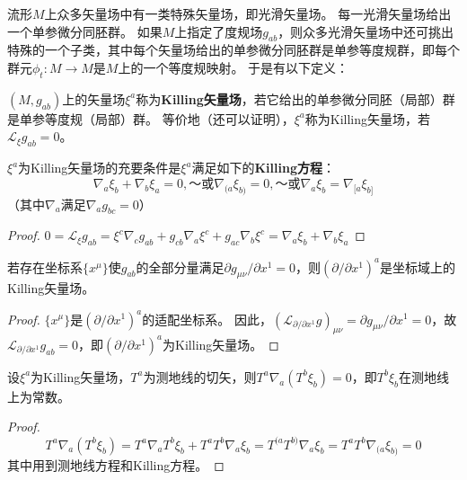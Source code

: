 流形$M$上众多矢量场中有一类特殊矢量场，即光滑矢量场。
每一光滑矢量场给出一个单参微分同胚群。
如果$M$上指定了度规场$g_{ab}$，则众多光滑矢量场中还可挑出特殊的一个子类，其中每个矢量场给出的单参微分同胚群是单参等度规群，即每个群元$\phi_t \colon M \to M$是$M$上的一个等度规映射。
于是有以下定义：

\begin{definition}
	$(M, g_{ab})$上的矢量场$\xi^a$称为\textbf{Killing矢量场}，若它给出的单参微分同胚（局部）群是单参等度规（局部）群。
	等价地（还可以证明），$\xi^a$称为Killing矢量场，若$\mathscr{L}_{\xi}g_{ab} = 0$。
\end{definition}

\begin{theorem}
	$\xi^a$为Killing矢量场的充要条件是$\xi^a$满足如下的\textbf{Killing方程}：
	$$\nabla_a\xi_b + \nabla_b\xi_a = 0, ～ \text{或} \nabla_{(a}\xi_{b)} = 0, ～ \text{或} \nabla_a\xi_b = \nabla_{[a}\xi_{b]}$$
	（其中$\nabla_a$满足$\nabla_ag_{bc} = 0$）
\end{theorem}

\begin{proof}
	$0 = \mathscr{L}_{\xi}g_{ab} = \xi^c\nabla_cg_{ab} + g_{cb}\nabla_a\xi^c + g_{ac}\nabla_b\xi^c = \nabla_a\xi_b + \nabla_b\xi_a$
\end{proof}

\begin{theorem}
	若存在坐标系$\{x^\mu\}$使$g_{ab}$的全部分量满足$\partial g_{\mu\nu} / \partial x^1 = 0$，则$(\partial / \partial x^1)^a$是坐标域上的Killing矢量场。
\end{theorem}

\begin{proof}
	$\{x^\mu\}$是$(\partial / \partial x^1)^a$的适配坐标系。
	因此，$(\mathscr{L}_{\partial / \partial x^1}g)_{\mu\nu} = \partial g_{\mu\nu} / \partial x^1 = 0$，故$\mathscr{L}_{\partial / \partial x^1}g_{ab} = 0$，即$(\partial / \partial x^1)^a$为Killing矢量场。
\end{proof}

\begin{theorem}
	设$\xi^a$为Killing矢量场，$T^a$为测地线的切矢，则$T^a\nabla_a(T^b\xi_b) = 0$，即$T^b\xi_b$在测地线上为常数。
\end{theorem}

\begin{proof}
	$$T^a\nabla_a(T^b\xi_b) = T^a\nabla_aT^b\xi_b + T^aT^b\nabla_a\xi_b = T^{(a}T^{b)}\nabla_{a}\xi_{b} = T^{a}T^{b}\nabla_{(a}\xi_{b)} = 0$$
	其中用到测地线方程和Killing方程。
\end{proof}

